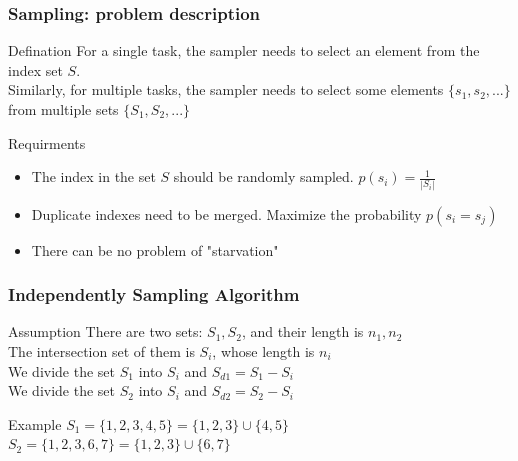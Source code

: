 \documentclass[notheorems, aspectratio=54]{beamer}
\begin{document}
\begin{frame}
    \frametitle{Sampling: problem description}
    \begin{block}{Defination}
        For a single task, the sampler needs to select an element from the index set $S$.\\
        Similarly, for multiple tasks, the sampler needs to select some elements $\{s_1, s_2, ...\}$ from multiple sets $\{S_1, S_2, ...\}$
    \end{block}
    \begin{block}{Requirments}
        \begin{itemize}
            \item The index in the set $S$ should be randomly sampled. $p(s_i) = \frac{1}{|S_i|}$
            \item Duplicate indexes need to be merged. Maximize the probability $p(s_i = s_j)$
            \item There can be no problem of "starvation"
        \end{itemize}
    \end{block}
\end{frame}

\begin{frame}
    \frametitle{Independently Sampling Algorithm}
    \begin{block}{Assumption}
        There are two sets: $S_1, S_2$, and their length is $n_1, n_2$ \\
        The intersection set of them is $S_i$, whose length is $n_i$ \\
        We divide the set $S_1$ into $S_i$ and $S_{d1} = S_1 - S_i$ \\
        We divide the set $S_2$ into $S_i$ and $S_{d2} = S_2 - S_i$
    \end{block}
    \begin{block}{Example}
        $S_1 = \{1,2,3,4,5\} = \{1,2,3\} \cup \{4,5\}$ \\
        $S_2 = \{1,2,3,6,7\} = \{1,2,3\} \cup \{6,7\}$
    \end{block}
\end{frame}
\end{document}

